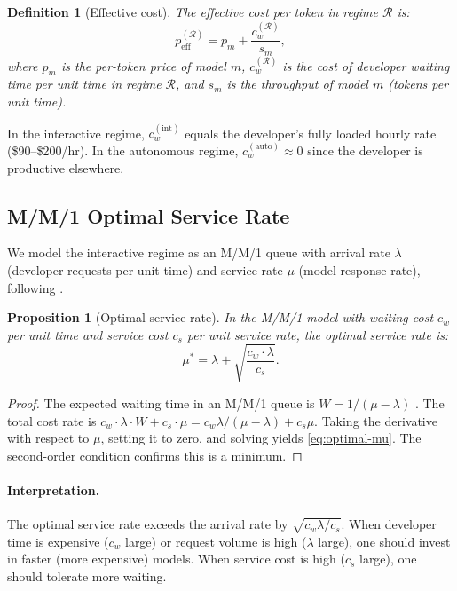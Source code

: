 \documentclass[11pt, a4paper, copyright]{googledeepmind}
\newtheorem{definition}{Definition}[section]
\newtheorem{proposition}{Proposition}[section]
\begin{document}
\begin{definition}[Effective cost]\label{def:effective-cost}
The \emph{effective cost per token} in regime $\mathcal{R}$ is:
\begin{equation}\label{eq:effective-cost}
    p_{\text{eff}}^{(\mathcal{R})} = p_m + \frac{c_w^{(\mathcal{R})}}{s_m},
\end{equation}
where $p_m$ is the per-token price of model $m$, $c_w^{(\mathcal{R})}$ is the cost of developer waiting time per unit time in regime $\mathcal{R}$, and $s_m$ is the throughput of model $m$ (tokens per unit time).
\end{definition}

In the interactive regime, $c_w^{(\text{int})}$ equals the developer's fully loaded hourly rate (\$90--\$200/hr). In the autonomous regime, $c_w^{(\text{auto})} \approx 0$ since the developer is productive elsewhere.

\subsection{M/M/1 Optimal Service Rate}

We model the interactive regime as an M/M/1 queue with arrival rate $\lambda$ (developer requests per unit time) and service rate $\mu$ (model response rate), following \citet{kleinrock1975}.

\begin{proposition}[Optimal service rate]\label{prop:optimal-mu}
In the M/M/1 model with waiting cost $c_w$ per unit time and service cost $c_s$ per unit service rate, the optimal service rate is:
\begin{equation}\label{eq:optimal-mu}
    \mu^* = \lambda + \sqrt{\frac{c_w \cdot \lambda}{c_s}}.
\end{equation}
\end{proposition}

\begin{proof}
The expected waiting time in an M/M/1 queue is $W = 1/(\mu - \lambda)$ \citep{kleinrock1975}. The total cost rate is $c_w \cdot \lambda \cdot W + c_s \cdot \mu = c_w \lambda / (\mu - \lambda) + c_s \mu$. Taking the derivative with respect to $\mu$, setting it to zero, and solving yields \cref{eq:optimal-mu}. The second-order condition confirms this is a minimum.
\end{proof}

\paragraph{Interpretation.}
The optimal service rate exceeds the arrival rate by $\sqrt{c_w \lambda / c_s}$. When developer time is expensive ($c_w$ large) or request volume is high ($\lambda$ large), one should invest in faster (more expensive) models. When service cost is high ($c_s$ large), one should tolerate more waiting.
\end{document}
